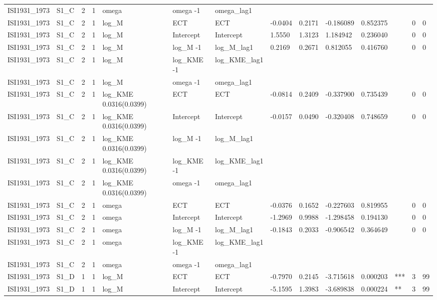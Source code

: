 \begin{tabular}{llllllllllllll}
ISI1931\_1973 & S1\_C & 2 & 1 & omega & omega -1 & omega\_lag1 &  &  &  &  &  &  &  \\
ISI1931\_1973 & S1\_C & 2 & 1 & log\_M & ECT & ECT & -0.0404 & 0.2171 & -0.186089 & 0.852375 &  & 0 & 0 \\
ISI1931\_1973 & S1\_C & 2 & 1 & log\_M & Intercept & Intercept & 1.5550 & 1.3123 & 1.184942 & 0.236040 &  & 0 & 0 \\
ISI1931\_1973 & S1\_C & 2 & 1 & log\_M & log\_M -1 & log\_M\_lag1 & 0.2169 & 0.2671 & 0.812055 & 0.416760 &  & 0 & 0 \\
ISI1931\_1973 & S1\_C & 2 & 1 & log\_M & log\_KME -1 & log\_KME\_lag1 &  &  &  &  &  &  &  \\
ISI1931\_1973 & S1\_C & 2 & 1 & log\_M & omega -1 & omega\_lag1 &  &  &  &  &  &  &  \\
ISI1931\_1973 & S1\_C & 2 & 1 & log\_KME 0.0316(0.0399) & ECT & ECT & -0.0814 & 0.2409 & -0.337900 & 0.735439 &  & 0 & 0 \\
ISI1931\_1973 & S1\_C & 2 & 1 & log\_KME 0.0316(0.0399) & Intercept & Intercept & -0.0157 & 0.0490 & -0.320408 & 0.748659 &  & 0 & 0 \\
ISI1931\_1973 & S1\_C & 2 & 1 & log\_KME 0.0316(0.0399) & log\_M -1 & log\_M\_lag1 &  &  &  &  &  &  &  \\
ISI1931\_1973 & S1\_C & 2 & 1 & log\_KME 0.0316(0.0399) & log\_KME -1 & log\_KME\_lag1 &  &  &  &  &  &  &  \\
ISI1931\_1973 & S1\_C & 2 & 1 & log\_KME 0.0316(0.0399) & omega -1 & omega\_lag1 &  &  &  &  &  &  &  \\
ISI1931\_1973 & S1\_C & 2 & 1 & omega & ECT & ECT & -0.0376 & 0.1652 & -0.227603 & 0.819955 &  & 0 & 0 \\
ISI1931\_1973 & S1\_C & 2 & 1 & omega & Intercept & Intercept & -1.2969 & 0.9988 & -1.298458 & 0.194130 &  & 0 & 0 \\
ISI1931\_1973 & S1\_C & 2 & 1 & omega & log\_M -1 & log\_M\_lag1 & -0.1843 & 0.2033 & -0.906542 & 0.364649 &  & 0 & 0 \\
ISI1931\_1973 & S1\_C & 2 & 1 & omega & log\_KME -1 & log\_KME\_lag1 &  &  &  &  &  &  &  \\
ISI1931\_1973 & S1\_C & 2 & 1 & omega & omega -1 & omega\_lag1 &  &  &  &  &  &  &  \\
ISI1931\_1973 & S1\_D & 1 & 1 & log\_M & ECT & ECT & -0.7970 & 0.2145 & -3.715618 & 0.000203 & *** & 3 & 99 \\
ISI1931\_1973 & S1\_D & 1 & 1 & log\_M & Intercept & Intercept & -5.1595 & 1.3983 & -3.689838 & 0.000224 & ** & 3 & 99 \\

\end{tabular}
